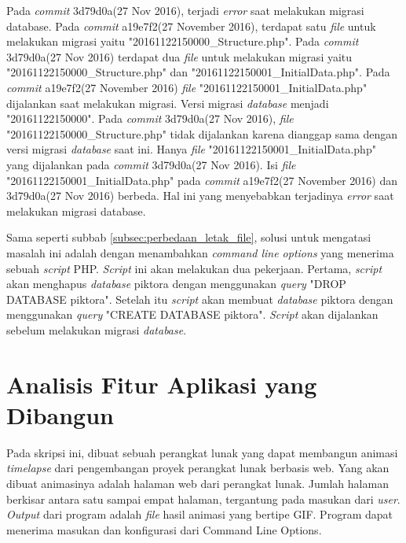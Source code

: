 Pada \textit{commit} 3d79d0a(27 Nov 2016), terjadi \textit{error} saat melakukan migrasi database. Pada \textit{commit} a19e7f2(27 November 2016), terdapat satu \textit{file} untuk melakukan migrasi yaitu "20161122150000\_Structure.php". Pada \textit{commit} 3d79d0a(27 Nov 2016) terdapat dua \textit{file} untuk melakukan migrasi yaitu "20161122150000\_Structure.php" dan "20161122150001\_InitialData.php". Pada \textit{commit} a19e7f2(27 November 2016) \textit{file} "20161122150001\_InitialData.php" dijalankan saat melakukan migrasi. Versi migrasi \textit{database} menjadi "20161122150000". Pada \textit{commit} 3d79d0a(27 Nov 2016), \textit{file} "20161122150000\_Structure.php" tidak dijalankan karena dianggap sama dengan versi migrasi \textit{database} saat ini. Hanya \textit{file} "20161122150001\_InitialData.php" yang dijalankan pada \textit{commit} 3d79d0a(27 Nov 2016). Isi \textit{file} "20161122150001\_InitialData.php" pada \textit{commit} a19e7f2(27 November 2016) dan 3d79d0a(27 Nov 2016) berbeda. Hal ini yang menyebabkan terjadinya \textit{error} saat melakukan migrasi database.  

Sama seperti subbab \ref{subsec:perbedaan_letak_file}, solusi untuk mengatasi masalah ini adalah dengan menambahkan \textit{command line options} yang menerima sebuah \textit{script} PHP. \textit{Script} ini akan melakukan dua pekerjaan. Pertama, \textit{script} akan menghapus \textit{database} piktora dengan menggunakan \textit{query} "DROP DATABASE piktora". Setelah itu \textit{script} akan membuat \textit{database} piktora dengan menggunakan \textit{query} "CREATE DATABASE piktora". \textit{Script} akan dijalankan sebelum melakukan migrasi \textit{database}. 

\section{Analisis Fitur Aplikasi yang Dibangun}
\label{sec:analisis_fitur_aplikasi}
Pada skripsi ini, dibuat sebuah perangkat lunak yang dapat membangun animasi \textit{timelapse}
dari pengembangan proyek perangkat lunak berbasis web. Yang akan dibuat animasinya adalah
halaman web dari perangkat lunak. Jumlah halaman berkisar antara satu sampai empat halaman, tergantung pada masukan dari \textit{user}. \textit{Output} dari program adalah \textit{file} hasil animasi yang bertipe GIF. Program dapat menerima masukan dan konfigurasi dari Command Line Options. 

